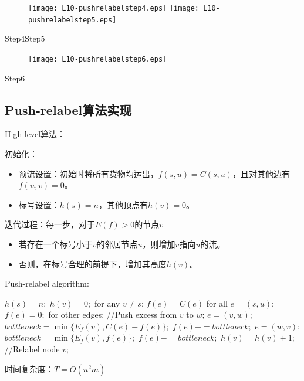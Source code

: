 \begin{figure}[H]
 \center
\texttt{[image: L10-pushrelabelstep4.eps]}
  \texttt{[image: L10-pushrelabelstep5.eps]}
\end{figure}
\hspace{3cm}Step4\hspace{7cm}Step5

\begin{figure}[H]
\center
\texttt{[image: L10-pushrelabelstep6.eps]}%
\end{figure}
\hspace{8cm}Step6
\subsection{Push-relabel算法实现}
High-level算法：

初始化：
\begin{itemize}
  \item 预流设置：初始时将所有货物均运出，$f(s,u)=C(s,u)$，且对其他边有$f(u,v)=0$。
  \item 标号设置：$h(s)=n$，其他顶点有$h(v)=0$。
\end{itemize}
迭代过程：每一步，对于$E(f)>0$的节点$v$
\begin{itemize}
  \item 若存在一个标号小于$v$的邻居节点$u$，则增加$v$指向$u$的流。
  \item 否则，在标号合理的前提下，增加其高度$h(v)$。
\end{itemize}
Push-relabel algorithm:
  \begin{algorithmic}[1]
    \STATE $h(s) = n; $
    \STATE $h(v) = 0; $ for any $v\neq s$;
    \STATE $f(e) = C(e) $ for all $e=(s,u)$;
    \STATE $f(e) = 0 ;$ for other edges;
    \STATE //Push excess from $v$ to $w$;
    \STATE $e=(v,w)$;
    \STATE $bottleneck = \min\{ E_f(v), C(e)-f(e) \};$
    \STATE $f(e) += bottleneck;$
    \ELSE
    \STATE $e=(w, v)$;
    \STATE  $bottleneck = \min\{ E_f(v), f(e) \};$
    \STATE $f(e) -= bottleneck;$
    \ENDIF
    \ELSE
    \STATE  $h(v)=h(v)+1;$  //Relabel node $v$;
    \ENDIF
    \ENDWHILE
  \end{algorithmic}

时间复杂度：$T=O(n^2m)$
